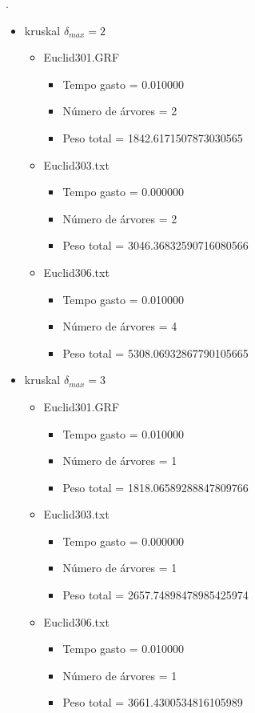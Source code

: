 .\begin{itemize}
\item kruskal $\delta_{max}=2$
\begin{itemize}
\item Euclid301.GRF
\begin{itemize}
\item Tempo gasto = 0.010000
\item Número de árvores = 2
\item Peso total = 1842.6171507873030565
\end{itemize}
\item Euclid303.txt
\begin{itemize}
\item Tempo gasto = 0.000000
\item Número de árvores = 2
\item Peso total = 3046.36832590716080566
\end{itemize}
\item Euclid306.txt
\begin{itemize}
\item Tempo gasto = 0.010000
\item Número de árvores = 4
\item Peso total = 5308.06932867790105665
\end{itemize}
\end{itemize}
\item kruskal $\delta_{max}=3$
\begin{itemize}
\item Euclid301.GRF
\begin{itemize}
\item Tempo gasto = 0.010000
\item Número de árvores = 1
\item Peso total = 1818.06589288847809766
\end{itemize}
\item Euclid303.txt
\begin{itemize}
\item Tempo gasto = 0.000000
\item Número de árvores = 1
\item Peso total = 2657.74898478985425974
\end{itemize}
\item Euclid306.txt
\begin{itemize}
\item Tempo gasto = 0.010000
\item Número de árvores = 1
\item Peso total = 3661.4300534816105989

\end{itemize}
\end{itemize}
\end{itemize}
